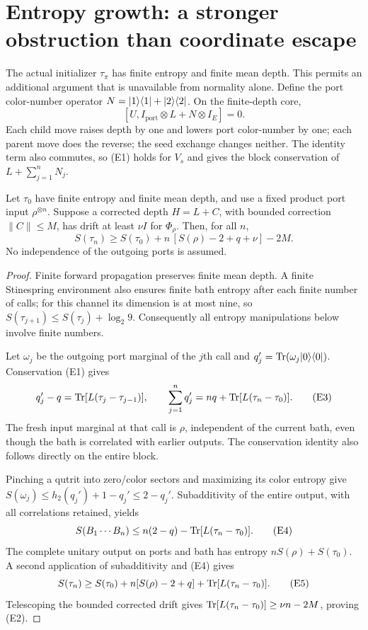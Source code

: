 \section{Entropy growth: a stronger obstruction than coordinate escape}
\label{sec:entropy}

The actual initializer $\tau_\pi$ has finite entropy and finite mean depth.
This permits an additional argument that is unavailable from normality alone.
Define the port color-number operator
$N=\lvert 1\rangle\langle 1\rvert+\lvert 2\rangle\langle 2\rvert$. On the finite-depth core,
\[
 [U,I_{\mathrm{port}}\otimes L+N\otimes I_E]=0.
 \tag{E1}
\]
Each child move raises depth by one and lowers port color-number by one;
each parent move does the reverse; the seed exchange changes neither.
The identity term also commutes, so (E1) holds for $V_s$ and gives the
block conservation of $L+\sum_{j=1}^nN_j$.

\begin{proposition}\label{prop:entropyflow}
Let $\tau_0$ have finite entropy and finite mean depth, and use a fixed
product port input $\rho^{\otimes n}$. Suppose a corrected depth
$H=L+C$, with bounded correction $\|C\|\le M$, has drift at least
$\nu I$ for $\Phi_\rho$.
Then, for all $n$,
\[
 S(\tau_n)\ge S(\tau_0)
       +n\,[S(\rho)-2+q+\nu]-2M.
 \tag{E2}
\]
No independence of the outgoing ports is assumed.
\end{proposition}
\begin{proof}
Finite forward propagation preserves finite mean depth. A finite
Stinespring environment also ensures finite bath entropy after each finite
number of calls; for this channel its dimension is at most nine, so
$S(\tau_{j+1})\le S(\tau_j)+\log_2 9$.
Consequently all entropy manipulations below involve finite numbers.

Let $\omega_j$ be the outgoing port marginal of the $j$th call and
$q_j'=\operatorname{Tr}(\omega_j\lvert 0\rangle\langle 0\rvert)$. Conservation (E1) gives
\[
 q_j'-q=\operatorname{Tr}[L(\tau_j-\tau_{j-1})],
 \qquad
 \sum_{j=1}^nq_j'=nq+\operatorname{Tr}[L(\tau_n-\tau_0)].
 \tag{E3}
\]
The fresh input marginal at that call is $\rho$, independent of the
current bath, even though the bath is correlated with earlier outputs.
The conservation identity also follows directly on the entire block.

Pinching a qutrit into zero/color sectors and maximizing its color
entropy give
$S(\omega_j)\le h_2(q_j')+1-q_j'\le2-q_j'$.
Subadditivity of the entire output, with all correlations retained, yields
\[
 S(B_1\cdots B_n)\le
 n(2-q)-\operatorname{Tr}[L(\tau_n-\tau_0)].
 \tag{E4}
\]
The complete unitary output on ports and bath has entropy
$nS(\rho)+S(\tau_0)$. A second application of subadditivity and (E4) gives
\[
 S(\tau_n)\ge S(\tau_0)+n[S(\rho)-2+q]
                        +\operatorname{Tr}[L(\tau_n-\tau_0)].
 \tag{E5}
\]
Telescoping the bounded corrected drift gives
$\operatorname{Tr}[L(\tau_n-\tau_0)]\ge\nu n-2M$, proving (E2).
\end{proof}

